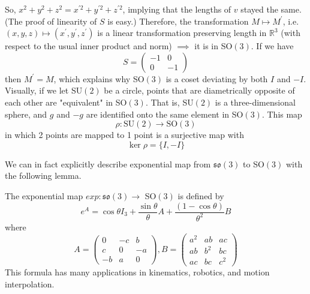 \documentclass{article}
\begin{document}
      So, $x^2 + y^2 + z^2 = x^{\prime 2} + y^{\prime 2} + z^{\prime 2}$, implying that the lengths of $v$ stayed the same. (The proof of linearity of $S$ is easy.) Therefore, the transformation $M \mapsto M^\prime$, i.e. $(x, y, z) \mapsto (x^\prime, y^\prime, z^\prime)$ is a linear transformation preserving length in $\mathbb{R}^3$ (with respect to the usual inner product and norm) $\implies$ it is in SO$(3)$. If we have
      \[S  = \begin{pmatrix}
      -1&0\\0&-1
      \end{pmatrix}\]
      then $M^\prime = M$, which explains why SO$(3)$ is a coset deviating by both $I$ and $-I$. Visually, if we let SU$(2)$ be a circle, points that are diametrically opposite of each other are "equivalent" in SO$(3)$. That is, SU$(2)$ is a three-dimensional sphere, and $g$ and $-g$ are identified onto the same element in SO$(3)$. This map
      \[\rho: \text{SU}(2) \longrightarrow \text{SO}(3)\]
      in which 2 points are mapped to 1 point is a surjective map with
      \[\ker{\rho} = \{I, -I\}\]
      \begin{center}
      \end{center}

      We can in fact explicitly describe exponential map from $\mathfrak{so}(3)$ to SO$(3)$ with the following lemma. 

      \begin{lemma}
      The exponential map $exp: \mathfrak{so}(3) \longrightarrow$ SO$(3)$ is defined by 
      \[e^A = \cos{\theta} I_3 + \frac{\sin{\theta}}{\theta} A + \frac{(1 - \cos{\theta})}{\theta^2} B\]
      where 
      \[A = \begin{pmatrix}
      0&-c&b\\c&0&-a\\-b&a&0
      \end{pmatrix}, B = \begin{pmatrix}
      a^2&ab&ac\\ab&b^2&bc\\ac&bc&c^2
      \end{pmatrix}\]
      This formula has many applications in kinematics, robotics, and motion interpolation. 
      \end{lemma}
\end{document}

